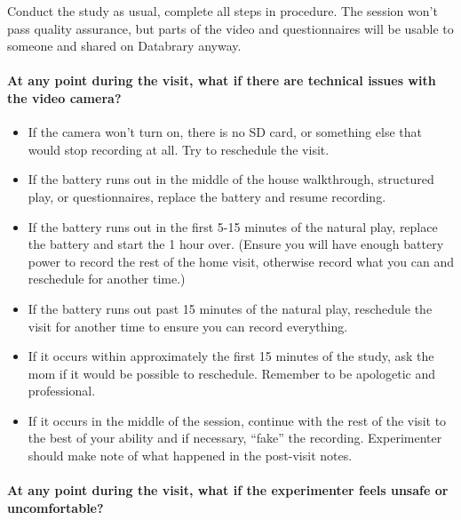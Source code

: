 \documentclass[
]{book}
\providecommand{\tightlist}{%
  \setlength{\itemsep}{0pt}\setlength{\parskip}{0pt}}
\begin{document}
Conduct the study as usual, complete all steps in procedure. The session won't pass quality assurance, but parts of the video and questionnaires will be usable to someone and shared on Databrary anyway.

\hypertarget{at-any-point-during-the-visit-what-if-there-are-technical-issues-with-the-video-camera}{%
\paragraph*{At any point during the visit, what if there are technical issues with the video camera?}\label{at-any-point-during-the-visit-what-if-there-are-technical-issues-with-the-video-camera}}

\begin{itemize}
\tightlist
\item
  If the camera won't turn on, there is no SD card, or something else that would stop recording at all. Try to reschedule the visit.
\item
  If the battery runs out in the middle of the house walkthrough, structured play, or questionnaires, replace the battery and resume recording.
\item
  If the battery runs out in the first 5-15 minutes of the natural play, replace the battery and start the 1 hour over. (Ensure you will have enough battery power to record the rest of the home visit, otherwise record what you can and reschedule for another time.)
\item
  If the battery runs out past 15 minutes of the natural play, reschedule the visit for another time to ensure you can record everything.
\item
  If it occurs within approximately the first 15 minutes of the study, ask the mom if it would be possible to reschedule. Remember to be apologetic and professional.\\
\item
  If it occurs in the middle of the session, continue with the rest of the visit to the best of your ability and if necessary, ``fake'' the recording. Experimenter should make note of what happened in the post-visit notes.
\end{itemize}

\hypertarget{at-any-point-during-the-visit-what-if-the-experimenter-feels-unsafe-or-uncomfortable}{%
\paragraph*{At any point during the visit, what if the experimenter feels unsafe or uncomfortable?}\label{at-any-point-during-the-visit-what-if-the-experimenter-feels-unsafe-or-uncomfortable}}
\end{document}
